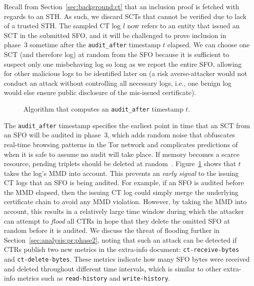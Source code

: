 Recall from Section~\ref{sec:background:ct} that an inclusion proof is fetched
with regards to an STH\@.  As such, we discard SCTs that cannot be verified due
to lack of a trusted STH\@.  The sampled CT log $l$ now refers to an entity that
issued an SCT in the submitted SFO, and it will be challenged to prove inclusion
in phase~3 sometime after the \texttt{audit\_after} timestamp $t$ elapsed. We
can choose one SCT (and therefore log) at random from the SFO because it is
sufficient to suspect only one misbehaving log so long as we report the entire
SFO, allowing for other malicious logs to be identified later on (a risk
averse-attacker would not conduct an attack without controlling all necessary
logs, i.e., one benign log would else ensure public disclosure of the mis-issued
certificate).

\begin{figure}
	\centering
	\caption{%
		Algorithm that computes an \texttt{audit\_after} timestamp $t$.
	}
	\label{fig:audit-after}
\end{figure}

The \texttt{audit\_after} timestamp specifies the earliest point in time that an
SCT from an SFO will be audited in phase~3, which adds random noise that
obfuscates real-time browsing patterns in the Tor network and complicates
predictions of when it is safe to assume no audit will take place. If memory
becomes a scarce resource, pending triplets should be deleted at
random~\cite{nordberg}. Figure~\ref{fig:audit-after} shows that $t$ takes the
log's MMD into account. This prevents an \emph{early signal} to the issuing CT
logs that an SFO is being audited.  For example, if an SFO is audited before the
MMD elapsed, then the issuing CT log could simply merge the underlying
certificate chain to avoid any MMD violation. However, by taking the MMD into
account, this results in a relatively large time window during which the
attacker can attempt to \emph{flood} all CTRs in hope that they delete the
omitted SFO at random before it is audited. We discuss the threat of flooding
further in Section~\ref{sec:analysis:pr:phase2}, noting that such an attack can
be detected if CTRs publish two new metrics in the extra-info document:
\texttt{ct-receive-bytes} and \texttt{ct-delete-bytes}. These metrics indicate
how many SFO bytes were received and deleted throughout different time
intervals, which is similar to other extra-info metrics such as
\texttt{read-history} and \texttt{write-history}.

